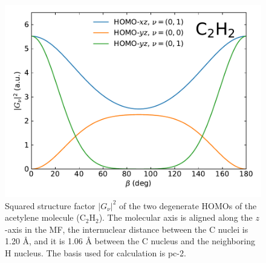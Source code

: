 \documentclass[preprint,12pt]{elsarticle} %
\renewcommand{\rm}[1]{\mathrm{#1}}    %
\newcommand{\abs}[1]{\lvert #1 \rvert}  %
\begin{document}
\begin{figure}
    \centering
    \includegraphics[width=\columnwidth]{C2H2_Example_sub_20230225.pdf}
    \caption{Squared structure factor $\abs{G_\nu}^2$ of the two degenerate HOMOs of the acetylene molecule ($\rm{C}_2 \rm{H}_2$). The molecular axis is aligned along the $z$-axis in the MF, the internuclear distance between the C nuclei is 1.20 \r{A}, and it is 1.06 \r{A} between the C nucleus and the neighboring H nucleus. The basis used for calculation is pc-2.}
    \label{fig:example_C2H2}
\end{figure}
\end{document}
